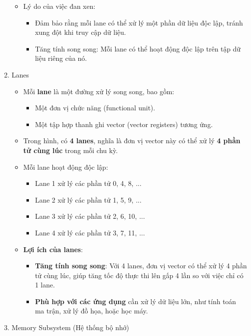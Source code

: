 \documentclass[a4paper]{article}
\begin{document}
\begin{enumerate}
\begin{itemize}
        \item Lý do của việc đan xen:
        \begin{itemize}
            \item Đảm bảo rằng mỗi lane có thể xử lý một phần dữ liệu độc lập, tránh xung đột khi truy cập dữ liệu.
            \item Tăng tính song song: Mỗi lane có thể hoạt động độc lập trên tập dữ liệu riêng của nó.
        \end{itemize}
    \end{itemize}
    \item Lanes
    \begin{itemize}
        \item Mỗi \textbf{lane} là một đường xử lý song song, bao gồm:
        \begin{itemize}
            \item Một đơn vị chức năng (functional unit).
            \item Một tập hợp thanh ghi vector (vector registers) tương ứng.
        \end{itemize}
        \item Trong hình, có \textbf{4 lanes}, nghĩa là đơn vị vector này có thể xử lý \textbf{4 phần tử cùng lúc} trong mỗi chu kỳ.
        \item Mỗi lane hoạt động độc lập:
        \begin{itemize}
            \item Lane 1 xử lý các phần tử 0, 4, 8, ...
            \item Lane 2 xử lý các phần tử 1, 5, 9, ...
            \item Lane 3 xử lý các phần tử 2, 6, 10, ...
            \item Lane 4 xử lý các phần tử 3, 7, 11, ...
        \end{itemize}
        \item \textbf{Lợi ích của lanes}:
        \begin{itemize}
            \item \textbf{Tăng tính song song}: Với 4 lanes, đơn vị vector có thể xử lý 4 phần tử cùng lúc, giúp tăng tốc độ thực thi lên gấp 4 lần so với việc chỉ có 1 lane.
            \item \textbf{Phù hợp với các ứng dụng} cần xử lý dữ liệu lớn, như tính toán ma trận, xử lý đồ họa, hoặc học máy.
        \end{itemize}
    \end{itemize}
    \item Memory Subsystem (Hệ thống bộ nhớ)

\end{enumerate}
\end{document}

